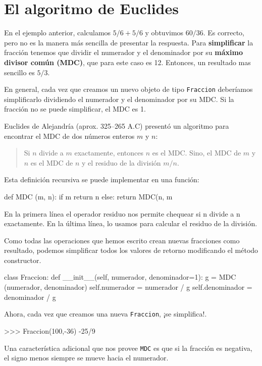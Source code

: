 \section{El algoritmo de Euclides}

  

En el ejemplo anterior, calculamos $5/6+5/6$ y obtuvimos $60/36$.
Es correcto, pero no es la manera más sencilla de presentar la respuesta.
Para \textbf{simplificar} la fracción tenemos que dividir el numerador
y el denominador por su \textbf{máximo divisor común (MDC)}, que para
este caso es 12. Entonces, un resultado mas sencillo es $5/3$.

En general, cada vez que creamos un nuevo objeto de tipo \texttt{Fraccion}
deberíamos simplificarlo dividiendo el numerador y el denominador
por su MDC. Si la fracción no se puede simplificar, el MDC es 1.

Euclides de Alejandría (aprox. 325–265 A.C) presentó un algoritmo
para encontrar el MDC de dos números enteros $m$ y $n$:
\begin{quote}
Si $n$ divide a $m$ exactamente, entonces $n$ es el MDC. Sino,
el MDC de $m$ y $n$ es el MDC de $n$ y el residuo de la división
$m/n$. 
\end{quote}
Esta definición recursiva se puede implementar en una función:

\begin{pythoncode}
def MDC (m, n):
  if m %
    return n
  else:
    return MDC(n, m%
\end{pythoncode}
 En la primera línea el operador residuo nos permite chequear si n
divide a n exactamente. En la última línea, lo usamos para calcular
el residuo de la división.

Como todas las operaciones que hemos escrito crean nuevas fracciones
como resultado, podemos simplificar todos los valores de retorno modificando
el método constructor.

\begin{pythoncode}
class Fraccion:
  def __init__(self, numerador, denominador=1):
    g = MDC (numerador, denominador)
    self.numerador   =   numerador / g
    self.denominador = denominador / g
\end{pythoncode}
 Ahora, cada vez que creamos una nueva \texttt{Fraccion}, ¡se simplifica!.

\begin{pyconcode}
>>> Fraccion(100,-36)
-25/9
\end{pyconcode}
 Una característica adicional que nos provee \texttt{MDC} es que si
la fracción es negativa, el signo menos siempre se mueve hacia el
numerador.

